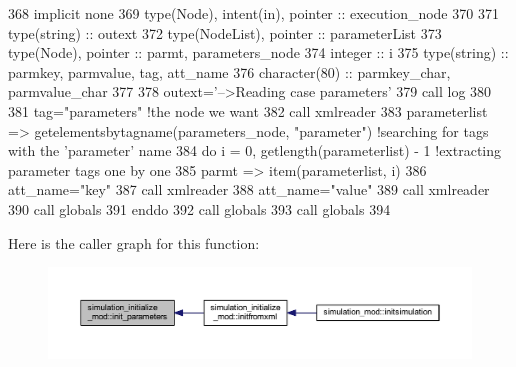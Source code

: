 \begin{DoxyCode}
368     \textcolor{keywordtype}{implicit none}
369     \textcolor{keywordtype}{type}(Node), \textcolor{keywordtype}{intent(in)}, \textcolor{keywordtype}{pointer} :: execution\_node
370 
371     \textcolor{keywordtype}{type}(string) :: outext
372     \textcolor{keywordtype}{type}(NodeList), \textcolor{keywordtype}{pointer} :: parameterList
373     \textcolor{keywordtype}{type}(Node), \textcolor{keywordtype}{pointer} :: parmt, parameters\_node
374     \textcolor{keywordtype}{integer} :: i
375     \textcolor{keywordtype}{type}(string) :: parmkey, parmvalue, tag, att\_name
376     \textcolor{keywordtype}{character(80)} :: parmkey\_char, parmvalue\_char
377 
378     outext=\textcolor{stringliteral}{'-->Reading case parameters'}
379     \textcolor{keyword}{call }log%
380 
381     tag=\textcolor{stringliteral}{"parameters"}    \textcolor{comment}{!the node we want}
382     \textcolor{keyword}{call }xmlreader%
383     parameterlist => getelementsbytagname(parameters\_node, \textcolor{stringliteral}{"parameter"})       \textcolor{comment}{!searching for tags with the
       'parameter' name}
384     \textcolor{keywordflow}{do} i = 0, getlength(parameterlist) - 1                          \textcolor{comment}{!extracting parameter tags one by one}
385         parmt => item(parameterlist, i)
386         att\_name=\textcolor{stringliteral}{"key"}
387         \textcolor{keyword}{call }xmlreader%
388         att\_name=\textcolor{stringliteral}{"value"}
389         \textcolor{keyword}{call }xmlreader%
390         \textcolor{keyword}{call }globals%
391 \textcolor{keywordflow}{    enddo}
392     \textcolor{keyword}{call }globals%
393     \textcolor{keyword}{call }globals%
394 
\end{DoxyCode}
Here is the caller graph for this function\+:
\nopagebreak
\begin{figure}[H]
\begin{center}
\leavevmode
\includegraphics[width=350pt]{namespacesimulation__initialize__mod_a4ee29d81788bb77840a67af18784da66_icgraph}
\end{center}
\end{figure}
\mbox{\label{namespacesimulation__initialize__mod_a7b30af4cf1a6ee74a4b2c6e8c9d1d98d}} 
